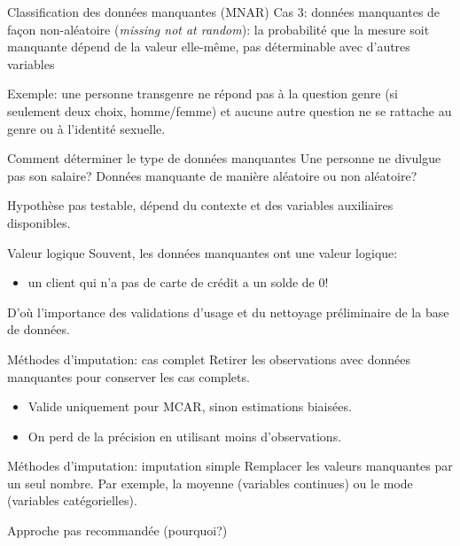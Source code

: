 \documentclass[
  ignorenonframetext,
]{beamer}
\providecommand{\tightlist}{%
  \setlength{\itemsep}{0pt}\setlength{\parskip}{0pt}}\usepackage{longtable,booktabs,array}
\begin{document}
\begin{frame}{Classification des données manquantes (MNAR)}
\protect\hypertarget{classification-des-donnuxe9es-manquantes-mnar}{}
Cas 3: données manquantes de façon non-aléatoire (\emph{missing not at
random}): la probabilité que la mesure soit manquante dépend de la
valeur elle-même, pas déterminable avec d'autres variables

Exemple: une personne transgenre ne répond pas à la question genre (si
seulement deux choix, homme/femme) et aucune autre question ne se
rattache au genre ou à l'identité sexuelle.
\end{frame}

\begin{frame}{Comment déterminer le type de données manquantes}
\protect\hypertarget{comment-duxe9terminer-le-type-de-donnuxe9es-manquantes}{}
Une personne ne divulgue pas son salaire? Données manquante de manière
aléatoire ou non aléatoire?

Hypothèse pas testable, dépend du contexte et des variables auxiliaires
disponibles.
\end{frame}

\begin{frame}{Valeur logique}
\protect\hypertarget{valeur-logique}{}
Souvent, les données manquantes ont une valeur logique:

\begin{itemize}
\tightlist
\item
  un client qui n'a pas de carte de crédit a un solde de 0!
\end{itemize}

D'où l'importance des validations d'usage et du nettoyage préliminaire
de la base de données.
\end{frame}

\begin{frame}{Méthodes d'imputation: cas complet}
\protect\hypertarget{muxe9thodes-dimputation-cas-complet}{}
Retirer les observations avec données manquantes pour conserver les cas
complets.

\begin{itemize}
\tightlist
\item
  Valide uniquement pour MCAR, sinon estimations biaisées.
\item
  On perd de la précision en utilisant moins d'observations.
\end{itemize}
\end{frame}

\begin{frame}{Méthodes d'imputation: imputation simple}
\protect\hypertarget{muxe9thodes-dimputation-imputation-simple}{}
Remplacer les valeurs manquantes par un seul nombre. Par exemple, la
moyenne (variables continues) ou le mode (variables catégorielles).

Approche pas recommandée (pourquoi?)
\end{frame}
\end{document}
